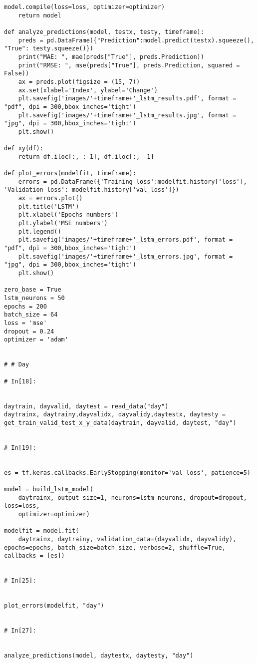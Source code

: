 \documentclass[12pt,a4paper]{article}
\begin{document}
\begin{lstlisting}[breaklines]
    model.compile(loss=loss, optimizer=optimizer)
    return model

def analyze_predictions(model, testx, testy, timeframe):
    preds = pd.DataFrame({"Prediction":model.predict(testx).squeeze(), "True": testy.squeeze()})
    print("MAE: ", mae(preds["True"], preds.Prediction))
    print("RMSE: ", mse(preds["True"], preds.Prediction, squared = False))
    ax = preds.plot(figsize = (15, 7))
    ax.set(xlabel='Index', ylabel='Change')
    plt.savefig('images/'+timeframe+'_lstm_results.pdf', format = "pdf", dpi = 300,bbox_inches='tight')
    plt.savefig('images/'+timeframe+'_lstm_results.jpg', format = "jpg", dpi = 300,bbox_inches='tight')
    plt.show()

def xy(df):
    return df.iloc[:, :-1], df.iloc[:, -1]

def plot_errors(modelfit, timeframe):
    errors = pd.DataFrame({'Training loss':modelfit.history['loss'], 'Validation loss': modelfit.history['val_loss']})
    ax = errors.plot()
    plt.title('LSTM')
    plt.xlabel('Epochs numbers')
    plt.ylabel('MSE numbers')
    plt.legend()
    plt.savefig('images/'+timeframe+'_lstm_errors.pdf', format = "pdf", dpi = 300,bbox_inches='tight')
    plt.savefig('images/'+timeframe+'_lstm_errors.jpg', format = "jpg", dpi = 300,bbox_inches='tight')
    plt.show()
    
zero_base = True
lstm_neurons = 50
epochs = 200
batch_size = 64
loss = 'mse'
dropout = 0.24
optimizer = 'adam'


# # Day

# In[18]:


daytrain, dayvalid, daytest = read_data("day")
daytrainx, daytrainy,dayvalidx, dayvalidy,daytestx, daytesty = get_train_valid_test_x_y_data(daytrain, dayvalid, daytest, "day")


# In[19]:


es = tf.keras.callbacks.EarlyStopping(monitor='val_loss', patience=5)

model = build_lstm_model(
    daytrainx, output_size=1, neurons=lstm_neurons, dropout=dropout, loss=loss,
    optimizer=optimizer)

modelfit = model.fit(
    daytrainx, daytrainy, validation_data=(dayvalidx, dayvalidy), epochs=epochs, batch_size=batch_size, verbose=2, shuffle=True, callbacks = [es])


# In[25]:


plot_errors(modelfit, "day")


# In[27]:


analyze_predictions(model, daytestx, daytesty, "day")



\end{lstlisting}
\end{document}
